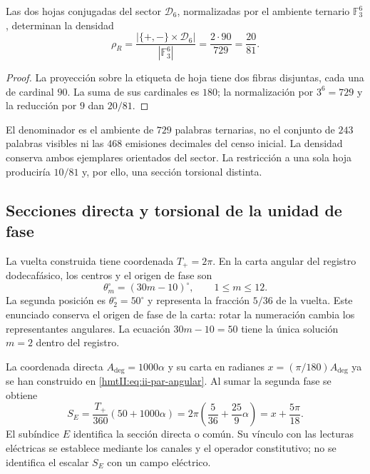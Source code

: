 \begin{proposition}
\label{iii:prop:radion-densidad}
Las dos hojas conjugadas del sector $\mathcal D_6$, normalizadas por el
ambiente ternario $\mathbb F_3^6$, determinan la densidad
\begin{equation}
 \rho_R=\frac{|\{+,-\}\times\mathcal D_6|}{|\mathbb F_3^6|}
       =\frac{2\cdot90}{729}=\frac{20}{81}.
 \label{iii:eq:radion-rho}
\end{equation}
\end{proposition}
\begin{proof}
La proyección sobre la etiqueta de hoja tiene dos fibras disjuntas, cada
una de cardinal $90$. La suma de sus cardinales es $180$; la normalización
por $3^6=729$ y la reducción por $9$ dan $20/81$.
\end{proof}

El denominador es el ambiente de $729$ palabras ternarias, no el conjunto
de $243$ palabras visibles ni las $468$ emisiones decimales del censo
inicial. La densidad conserva ambos ejemplares orientados del sector.
La restricción a una sola hoja produciría $10/81$ y, por ello, una sección
torsional distinta.

\subsection{Secciones directa y torsional de la unidad de fase}
\label{iii:subsec:radion-secciones}

La vuelta construida tiene coordenada $T_+=2\pi$. En la carta angular del
registro dodecafásico, los centros y el origen de fase son
\begin{equation}
 \theta_m^\circ=(30m-10)^\circ,\qquad 1\leq m\leq12.
 \label{iii:eq:radion-calendario}
\end{equation}
La segunda posición es $\theta_2^\circ=50^\circ$ y representa la fracción
$5/36$ de la vuelta. Este enunciado conserva el origen de fase de la carta:
rotar la numeración cambia los representantes angulares. La ecuación
$30m-10=50$ tiene la única solución $m=2$ dentro del registro.

La coordenada directa $A_{\deg}=1000\alpha$ y su carta en radianes
$x=(\pi/180)A_{\deg}$ ya se han construido en
\eqref{hmtII:eq:ii-par-angular}. Al sumar la segunda fase se obtiene
\begin{equation}
 S_E=\frac{T_+}{360}(50+1000\alpha)
     =2\pi\left(\frac5{36}+\frac{25}{9}\alpha\right)
     =x+\frac{5\pi}{18}.
 \label{iii:eq:radion-SE}
\end{equation}
El subíndice $E$ identifica la sección directa o común. Su vínculo con las
lecturas eléctricas se establece mediante los canales y el operador
constitutivo; no se identifica el escalar $S_E$ con un campo eléctrico.

